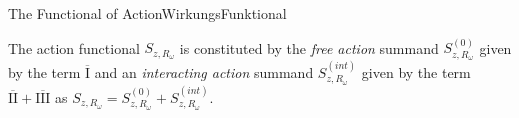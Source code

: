 \begin{mcor}{The Functional of Action}{WirkungsFunktional}

    The action functional $S_{z,R_\omega}$ is constituted by the \emph{free action} summand $S_{z,R_\omega}^{(0)}$ given by the term $\overline{\text{I}}$ and an \emph{interacting action} summand $S_{z,R_\omega}^{(int)}$ given by the term $\overline{\text{II}} + \overline{\text{III}}$ as $S_{z,R_\omega} = S_{z,R_\omega}^{(0)} + S_{z,R_\omega}^{(int)}$.
\end{mcor}